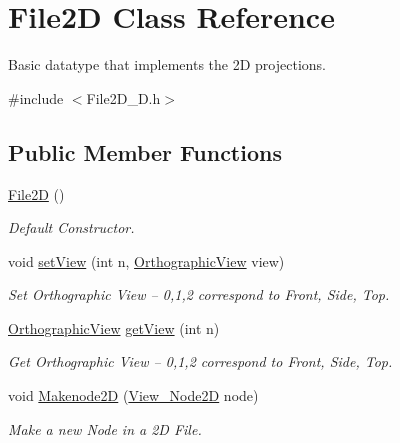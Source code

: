 \hypertarget{class_file2_d}{}\section{File2D Class Reference}
\label{class_file2_d}


Basic datatype that implements the 2D projections.  




{\ttfamily \#include $<$File2\+D\+\_\+D.\+h$>$}

\subsection*{Public Member Functions}
\begin{DoxyCompactItemize}
\item 
\mbox{\label{class_file2_d_ae28237705afb666932dfaeb78b7200a2}} 
\mbox{\hyperlink{class_file2_d_ae28237705afb666932dfaeb78b7200a2}{File2D}} ()
\begin{DoxyCompactList}\small\item\em Default Constructor. \end{DoxyCompactList}\item 
\mbox{\label{class_file2_d_ad10dfe2a6c2674869a319a0ca87d2608}} 
void \mbox{\hyperlink{class_file2_d_ad10dfe2a6c2674869a319a0ca87d2608}{set\+View}} (int n, \mbox{\hyperlink{class_orthographic_view}{Orthographic\+View}} view)
\begin{DoxyCompactList}\small\item\em Set Orthographic View -- 0,1,2 correspond to Front, Side, Top. \end{DoxyCompactList}\item 
\mbox{\label{class_file2_d_af0bae21e86d3b5dd40fe1b296f62b0e9}} 
\mbox{\hyperlink{class_orthographic_view}{Orthographic\+View}} \mbox{\hyperlink{class_file2_d_af0bae21e86d3b5dd40fe1b296f62b0e9}{get\+View}} (int n)
\begin{DoxyCompactList}\small\item\em Get Orthographic View -- 0,1,2 correspond to Front, Side, Top. \end{DoxyCompactList}\item 
void \mbox{\hyperlink{class_file2_d_a83bb7013172551ad378303df7f0001a9}{Makenode2D}} (\mbox{\hyperlink{class_view___node2_d}{View\+\_\+\+Node2D}} node)
\begin{DoxyCompactList}\small\item\em Make a new Node in a 2D File. \end{DoxyCompactList}\item 

\end{DoxyCompactItemize}
